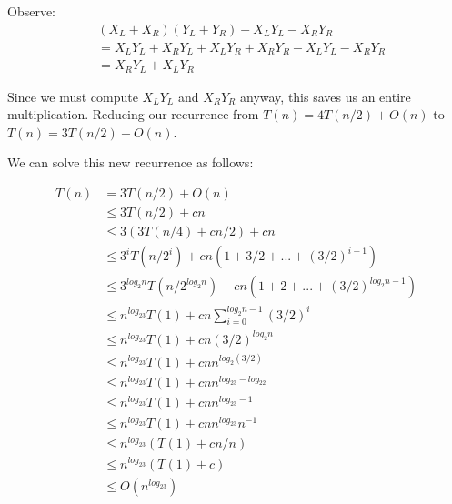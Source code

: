 Observe: 
%
\begin{align*}
&(X_L + X_R)(Y_L + Y_R) - X_LY_L - X_RY_R \\
&= X_LY_L + X_RY_L + X_LY_R + X_RY_R - X_LY_L - X_RY_R \\
&= X_RY_L + X_LY_R
\end{align*}

Since we must compute $X_LY_L$ and $X_RY_R$ anyway, this saves us an
entire multiplication.  Reducing our recurrence from $T(n) = 4T(n/2) +
O(n)$ to $T(n) = 3T(n/2) + O(n)$.

We can solve this new recurrence as follows:

\begin{align*}
T(n)
&= 3T(n/2) + O(n) \\
&\leq 3T(n/2) + cn \\
&\leq 3(3T(n/4) + cn/2) + cn \\
&\leq 3^iT(n/2^i) + cn(1 + 3/2 + ... + (3/2)^{i-1}) \\
&\leq 3^{log_2n}T(n/2^{log_2n}) + cn(1 + 2 + ... + (3/2)^{log_2n-1}) \\
&\leq n^{log_23}T(1) + cn \sum\limits_{i=0}^{log_2n-1} (3/2)^i \\
&\leq n^{log_23}T(1) + cn (3/2)^{log_2n} \\
&\leq n^{log_23}T(1) + cn n^{log_2(3/2)} \\
&\leq n^{log_23}T(1) + cn n^{log_23 - log_22} \\
&\leq n^{log_23}T(1) + cn n^{log_23 - 1} \\
&\leq n^{log_23}T(1) + cn n^{log_23}n^{-1} \\
&\leq n^{log_23}(T(1) + cn/n) \\
&\leq n^{log_23}(T(1) + c) \\
&\leq O(n^{log_23})
\end{align*}
